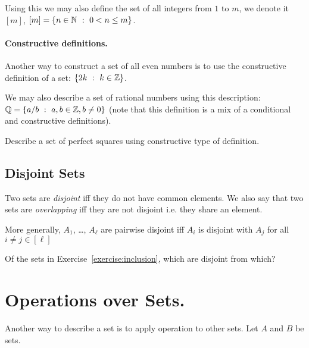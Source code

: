Using this we may also define the set of all integers from $1$ to $m$, we
denote it $[m]$, $[m] = \set[0 < n \le m]{n \in \N}$.

\paragraph{Constructive definitions.} Another way to construct a set of all
even numbers is to use the constructive definition of a set:
$\set[k \in \Z]{2k}$.

We may also describe a set of rational numbers using this description:
$\Q = \set[a, b \in \Z, b \neq 0]{a / b}$ (note that this definition is a mix of
a conditional and constructive definitions).

\begin{exercise}
  Describe a set of perfect squares using constructive type of definition.
\end{exercise}

\subsection{Disjoint Sets}
Two sets are \textit{disjoint} iff they do not have common elements. We also
say that two sets are \textit{overlapping} iff they are not disjoint i.e. they
share an element.

More generally, $A_1$, \dots, $A_\ell$ are pairwise disjoint iff $A_i$ is
disjoint with $A_j$ for all $i \neq j \in [\ell]$

\begin{exercise}
  Of the sets in Exercise~\ref{exercise:inclusion}, which are disjoint from
  which?
\end{exercise}


\section{Operations over Sets.}
Another way to describe a set is to apply operation to other sets. Let $A$ and
$B$ be sets.

